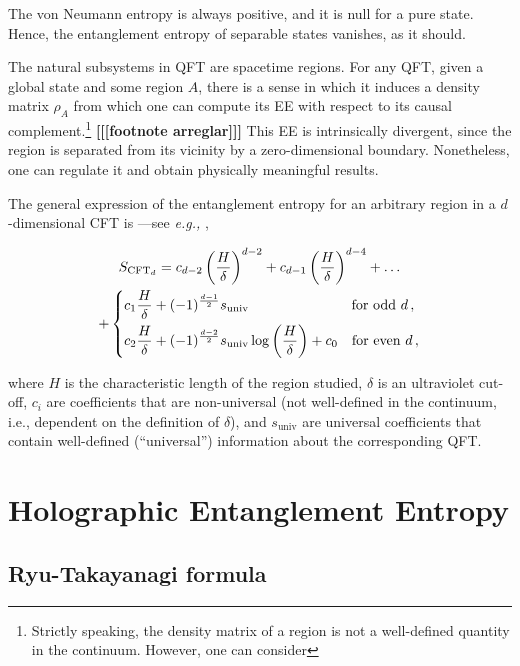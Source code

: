 \documentclass[twocolumn]{revtex4}
\providecommand{\eqgat}[2]{
    \begin{gather}
        #2
    \label{eq:#1}
    \end{gather}
}
\begin{document}
The von Neumann entropy is always positive, and it is null for a pure state. Hence, the entanglement entropy of separable states vanishes, as it should. 


The natural subsystems in QFT are spacetime regions. For any QFT, given a global state and some region $A$, there is a sense in which it induces a density matrix $\rho_A$ from which one can compute its EE with respect to its causal complement.\footnote{Strictly speaking, the density matrix of a region is not a well-defined quantity in the continuum. However, one can consider } {\bf [[[footnote arreglar]]]}
This EE is intrinsically divergent, since the region is separated from its vicinity by a zero-dimensional boundary. Nonetheless, one can regulate it and obtain physically meaningful results.

The general expression of the entanglement entropy for an arbitrary region in a $d$-dimensional CFT is ---see {\emph{e.g.,}} \cite{nishioka_entanglement_2018},
\eqgat{EE}{
    S_{\text{CFT}_d} = c_{d-2} \left( \frac{H}{\delta} \right) ^{d-2} + c_{d-1} \left( \frac{H}{\delta} \right) ^{d-4} + \dots  \\
    + \begin{dcases}
        c_1 \frac{H}{\delta} + (-1)^{\frac{d-1}{2}} s_{\text{univ}}
        \qquad \qquad \qquad \quad \ \text{for odd } d \, , \\
        c_2  \frac{H}{\delta} + (-1)^{\frac{d-2}{2}} s_{\text{univ}} \log \left ( \frac{H}{\delta} \right ) + c_0
        \quad \text{for even } d \, ,
    \end{dcases} \nonumber
}
where $H$ is the characteristic length of the region studied, $\delta$ is an ultraviolet cut-off, $c_i$ are coefficients that are non-universal (not well-defined in the continuum, i.e., dependent on the definition of $\delta$), and $s_{\text{univ}}$ are universal coefficients that contain well-defined (``universal'') information about the corresponding QFT.


\section{Holographic Entanglement Entropy} \label{s:EE_Holo}


\subsection{Ryu-Takayanagi formula} \label{ss:R-T}
\end{document}
